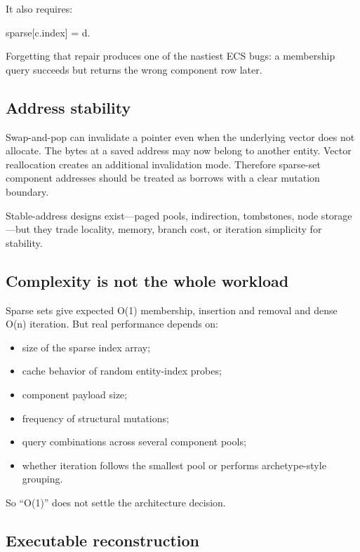 It also requires:

sparse{[}c.index{]} = d.

Forgetting that repair produces one of the nastiest ECS bugs: a membership query succeeds but returns the wrong component row later.

\subsection{Address stability}\label{appendix-8404d0b1a3e7-address-stability}

Swap-and-pop can invalidate a pointer even when the underlying vector does not allocate. The bytes at a saved address may now belong to another entity. Vector reallocation creates an additional invalidation mode. Therefore sparse-set component addresses should be treated as borrows with a clear mutation boundary.

Stable-address designs exist---paged pools, indirection, tombstones, node storage---but they trade locality, memory, branch cost, or iteration simplicity for stability.

\subsection{Complexity is not the whole workload}\label{appendix-8404d0b1a3e7-complexity-is-not-the-whole-workload}

Sparse sets give expected O(1) membership, insertion and removal and dense O(n) iteration. But real performance depends on:

\begin{itemize}
\tightlist
\item
  size of the sparse index array;
\item
  cache behavior of random entity-index probes;
\item
  component payload size;
\item
  frequency of structural mutations;
\item
  query combinations across several component pools;
\item
  whether iteration follows the smallest pool or performs archetype-style grouping.
\end{itemize}

So ``O(1)'' does not settle the architecture decision.

\subsection{Executable reconstruction}\label{appendix-8404d0b1a3e7-executable-reconstruction}


